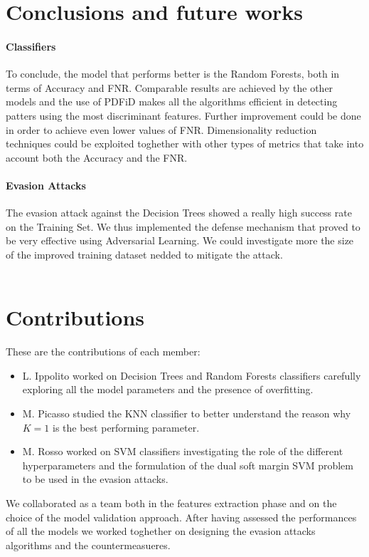 \documentclass[twocolumn, switch]{article} %
\begin{document}
\section{Conclusions and future works}
\label{sec:conclusions}
\paragraph{Classifiers}
To conclude, the model that performs better is the Random Forests, both in terms of Accuracy and FNR. Comparable results are achieved by the other models and the use of PDFiD makes all the algorithms efficient in detecting patters using the most discriminant features. Further improvement could be done in order to achieve even lower values of FNR. Dimensionality reduction techniques could be exploited toghether with other types of metrics that take into account both the Accuracy and the FNR.
\paragraph{Evasion Attacks}
The evasion attack against the Decision Trees showed a really high success rate on the Training Set. We thus implemented the defense mechanism that proved to be very effective using Adversarial Learning. We could investigate more the size of the improved training dataset nedded to mitigate the attack.
\\
\\
\section{Contributions}
\label{sec:contributions}
These are the contributions of each member:
\begin{itemize}
	\item L. Ippolito worked on Decision Trees and Random Forests classifiers carefully exploring all the model parameters and the presence of overfitting.
	\item M. Picasso studied the KNN classifier to better understand the reason why $K=1$ is the best performing parameter.
	\item M. Rosso worked on SVM classifiers investigating the role of the different hyperparameters and the formulation of the dual soft margin SVM problem to be used in the evasion attacks.
\end{itemize}
We collaborated as a team both in the features extraction phase and on the choice of the model validation approach. After having assessed the performances of all the models we worked toghether on designing the evasion attacks algorithms and the countermeasueres.
\end{document}
